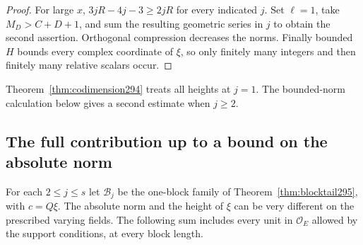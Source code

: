 \documentclass[a4paper,11pt]{article}
\theoremstyle{definition}
\theoremstyle{remark}
\numberwithin{equation}{section}
\begin{document}
\begin{proof}
For large \(x\), \(3jR-4j-3\ge2jR\) for every
indicated \(j\). Set \(\ell=1\), take \(M_D>C+D+1\),
and sum the resulting geometric series in \(j\) to obtain
the second assertion. Orthogonal compression decreases
the norms. Finally bounded \(H\) bounds every complex
coordinate of \(\xi\), so only finitely many integers
and then finitely many relative scalars occur.
\end{proof}

Theorem~\ref{thm:codimension294} treats all heights at \(j=1\). The bounded-norm calculation below gives a second estimate when \(j\ge2\).

\subsection{The full contribution up to a bound on the absolute norm}\label{nav:I-71}
For each \(2\le j\le s\) let \(\mathcal B_j\) be the one-block
family of Theorem~\ref{thm:blocktail295}, with \(c=Q\xi\).
The absolute norm and the height of \(\xi\) can be very
different on the prescribed varying fields. The following
sum includes every unit in \(\mathcal O_E\) allowed by the
support conditions, at every block length.
\end{document}
